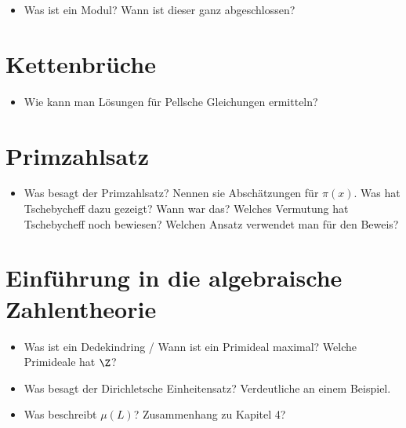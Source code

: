 \documentclass{scrartcl}
\begin{document}
\begin{itemize}
	\item
		Was ist ein Modul?
		Wann ist dieser ganz abgeschlossen?
\end{itemize}

\section{Kettenbrüche}

\begin{itemize}
	\item
		Wie kann man Lösungen für Pellsche Gleichungen ermitteln?
\end{itemize}

\section{Primzahlsatz}

\begin{itemize}
	\item
		Was besagt der Primzahlsatz?
		Nennen sie Abschätzungen für $\pi(x)$.
		Was hat Tschebycheff dazu gezeigt? Wann war das?
		Welches Vermutung hat Tschebycheff noch bewiesen?
		Welchen Ansatz verwendet man für den Beweis?
\end{itemize}

\section{Einführung in die algebraische Zahlentheorie}

\begin{itemize}
	\item
		Was ist ein Dedekindring / Wann ist ein Primideal maximal?
		Welche Primideale hat $\Z$?
	\item
		Was besagt der Dirichletsche Einheitensatz?
		Verdeutliche an einem Beispiel.
	\item
		Was beschreibt $\mu(L)$?
		Zusammenhang zu Kapitel 4?
\end{itemize}
\end{document}
